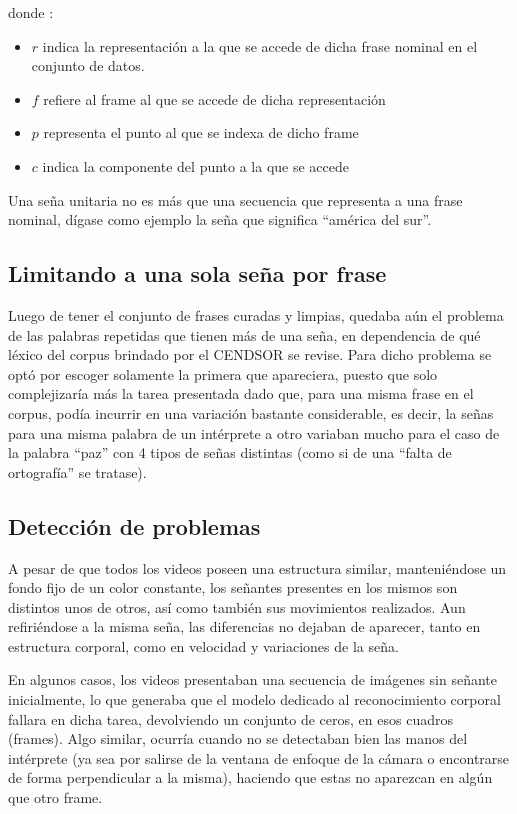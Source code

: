 donde :
\begin{itemize}
 \item $r$ indica la representación a la que se accede de dicha frase nominal en el conjunto de datos.
 \item $f$ refiere al frame al que se accede de dicha representación
 \item $p$ representa el punto al que se indexa de dicho frame
 \item $c$ indica la componente del punto a la que se accede
\end{itemize}
 
  Una seña unitaria no es más que una secuencia que representa a una frase nominal, dígase como ejemplo la seña que significa  ``américa del sur''. 

\subsection{Limitando a una sola seña por frase}
Luego de tener el conjunto de frases curadas y limpias, quedaba aún el problema de las palabras repetidas que tienen más de una seña, en dependencia de qué léxico del corpus brindado por el CENDSOR se revise.
Para dicho problema se optó por escoger solamente la primera que apareciera, puesto que solo complejizaría más la tarea presentada dado que, para una misma frase en el corpus, podía incurrir en una variación bastante considerable, es decir, la señas para una misma palabra de un intérprete a otro variaban mucho para el caso de la palabra ``paz'' con 4 tipos de señas distintas (como si de una ``falta de ortografía'' se tratase). 

\subsection{Detección de problemas}
A pesar de que todos los videos poseen una estructura similar, manteniéndose un fondo fijo de un color constante, los señantes presentes en los mismos son distintos unos de otros, así como también sus movimientos realizados. Aun refiriéndose a la misma seña, las diferencias no dejaban de aparecer, tanto en estructura corporal, como en velocidad y variaciones de la seña.

En algunos casos, los videos presentaban una secuencia de imágenes sin señante inicialmente, lo que generaba que el modelo dedicado al reconocimiento corporal fallara en dicha tarea, devolviendo un conjunto de ceros, en esos cuadros (frames). Algo similar, ocurría cuando no se detectaban bien las manos del intérprete (ya sea por salirse de la ventana de enfoque de la cámara o encontrarse de forma perpendicular a la misma), haciendo que estas no aparezcan en algún que otro frame.

